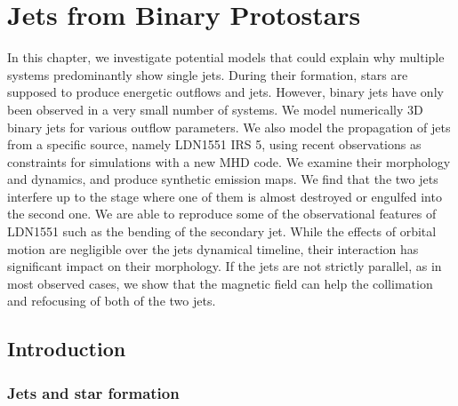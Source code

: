 \chapter {Jets from Binary Protostars}
\label{BinaryJetsChap}


In this chapter, we investigate potential models that could explain why multiple systems
predominantly show single jets.
During their formation, stars are supposed
to produce energetic outflows and jets.
However, binary jets have only been observed in a very small number of systems.
We model numerically 3D binary jets for various outflow parameters.
We also model the propagation of jets from a specific source, namely LDN1551 IRS
5,
using recent observations as constraints for simulations with a new MHD code.
We examine their morphology and dynamics, and produce synthetic emission maps.
We find that the two jets interfere up to the stage where
one of them is almost destroyed or engulfed into the second one.
We are able to reproduce some of the observational features of LDN1551
such as the bending of the secondary jet.
While the effects of orbital motion are negligible over the jets dynamical
timeline,
their interaction has significant impact on their morphology.
If the jets are not strictly parallel, as in most observed cases, we show that
the magnetic field can help the collimation and refocusing of both of the two
jets.


\section{Introduction}
\subsection{Jets and star formation}
%
%
%
%

